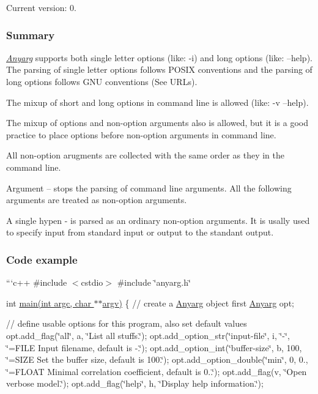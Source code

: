 Current version\+: 0.

\subsubsection*{Summary}

{\itshape \hyperlink{class_anyarg}{Anyarg}} supports both single letter options (like\+: -\/i) and long options (like\+: --help). The parsing of single letter options follows P\+O\+S\+I\+X conventions and the parsing of long options follows G\+N\+U conventions (See U\+R\+Ls).

The mixup of short and long options in command line is allowed (like\+: -\/v --help).

The mixup of options and non-\/option arguments also is allowed, but it is a good practice to place options before non-\/option arguments in command line.

All non-\/option arugments are collected with the same order as they in the command line.

Argument -- stops the parsing of command line arguments. All the following arguments are treated as non-\/option arguments.

A single hypen -\/ is parsed as an ordinary non-\/option arguments. It is usally used to specify input from standard input or output to the standant output.

\subsubsection*{Code example}

```c++ \#include $<$cstdio$>$ \#include \char`\"{}anyarg.\+h\char`\"{}

int \hyperlink{example_8cpp_a3c04138a5bfe5d72780bb7e82a18e627}{main(int argc, char $\ast$$\ast$argv)} \{ // create a \hyperlink{class_anyarg}{Anyarg} object first \hyperlink{class_anyarg}{Anyarg} opt;

// define usable options for this program, also set default values opt.\+add\+\_\+flag(\char`\"{}all\char`\"{}, \textquotesingle{}a\textquotesingle{}, \char`\"{}\+List all stuffs.\char`\"{}); opt.\+add\+\_\+option\+\_\+str(\char`\"{}input-\/file\char`\"{}, \textquotesingle{}i\textquotesingle{}, \char`\"{}-\/\char`\"{}, \char`\"{}=\+F\+I\+L\+E Input filename, default is -\/.\char`\"{}); opt.\+add\+\_\+option\+\_\+int(\char`\"{}buffer-\/size\char`\"{}, \textquotesingle{}b\textquotesingle{}, 100, \char`\"{}=\+S\+I\+Z\+E Set the buffer size, default is 100.\char`\"{}); opt.\+add\+\_\+option\+\_\+double(\char`\"{}min\char`\"{}, 0, 0., \char`\"{}=\+F\+L\+O\+A\+T Minimal correlation coefficient, default is 0..\char`\"{}); opt.\+add\+\_\+flag(\textquotesingle{}v\textquotesingle{}, \char`\"{}\+Open verbose model.\char`\"{}); opt.\+add\+\_\+flag(\char`\"{}help\char`\"{}, \textquotesingle{}h\textquotesingle{}, \char`\"{}\+Display help information.\char`\"{});

